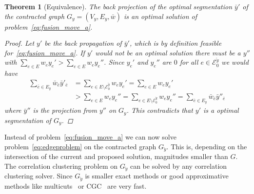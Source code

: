 \documentclass[10pt,twocolumn,letterpaper]{article}
\newtheorem{theorem}{Theorem}
\theoremstyle{definition}
\newtheorem{definition}{Definition}
\begin{document}



\begin{theorem}[Equivalence]\label{thm:Equivalence}
The back projection of the optimal segmentation $\bar{y}'$ of the contracted graph $G_y=(V_y,E_y, \bar{w})$
is an optimal solution of problem~\ref{eq:fusion_move_a}.
\begin{proof}
Let $y'$ be the back propagation of $\bar{y}'$, which is by definition feasible for~\ref{eq:fusion_move_a}.
If $y'$ would not be an optimal solution there must be a $y''$ with 
$\sum_{e\in E} w_ey_e' > \sum_{e\in E} w_ey_e''$.
Since $y_e'$ and $y_e''$ are $0$ for all $e \in \mathcal{E}_0^{\breve{y}}$ we would have
\begin{align*}
  \sum_{\bar{e}\in E_y} \bar{w}_{\bar{e}}\bar{y}'_{\bar{e}}
 &= \sum_{e\in E \setminus \mathcal{E}_0^{\breve{y}}} w_ey_e'          
  = \sum_{e\in E} w_ey_e' \\
 &> \sum_{e\in E} w_ey_e''
  = \sum_{e\in E \setminus \mathcal{E}_0^{\breve{y}}} w_ey_e''
  =\sum_{\bar{e}\in E_y} \bar{w}_{\bar{e}}\bar{y}''_{\bar{e}}
\end{align*}
where $\bar{y}''$ is the projection from $y''$ on $G_y$.
This contradicts that $y'$ is a optimal segmentation of $G_y$.
\end{proof}
%
\end{theorem}

Instead of problem~\ref{eq:fusion_move_a} we can now solve problem~\ref{eq:edgeproblem} on the contracted graph $G_{\breve{y}}$.
This is, depending on the intersection of the current and proposed solution, magnitudes smaller than $G$.
The correlation clustering problem on $G_{\breve{y}}$ can be solved by any correlation clustering solver.
Since $G_{\breve{y}}$ is smaller exact methods or good approximative methods like 
multicuts~\cite{kappes_2013_arxiv} or CGC~\cite{beier_2014_cvpr}
are very fast.
\end{document}
